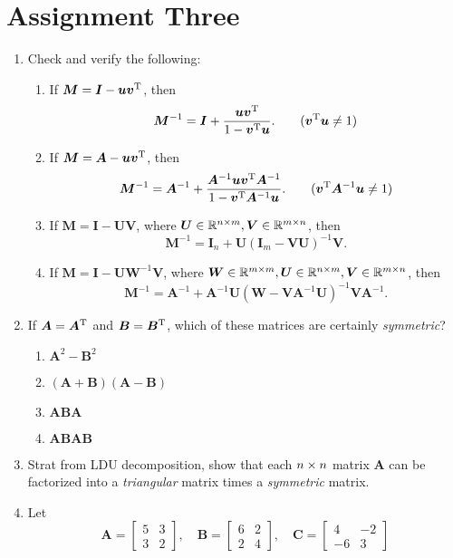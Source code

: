\section{Assignment Three}
\begin{enumerate}
\item
Check and verify the following:
\begin{enumerate}
\item
If $\bm M=\bm I-\bm u\bm v^{\mathrm T}$, then \[\bm M^{-1}=\bm I+\frac{\bm u\bm v^{\mathrm T}}{1-\bm v^{\mathrm T}\bm u}.\qquad(\bm v^{\mathrm T}\bm u\ne1)\]
\item
If $\bm M=\bm A-\bm u\bm v^{\mathrm T}$, then \[\bm M^{-1}=\bm A^{-1}+\frac{\bm A^{-1}\bm u\bm v^{\mathrm T}\bm A^{-1}}{1-\bm v^{\mathrm T}\bm A^{-1}\bm u}.\qquad(\bm v^{\mathrm T}\bm A^{-1}\bm u\ne1)\]
\item
If $\bm M=\bm I-\bm U\bm V$, where $\bm U\in\mathbb{R}^{n\times m},\bm V\in\mathbb{R}^{m\times n}$, then \[\bm M^{-1}=\bm I_n+\bm U(\bm I_m-\bm V\bm U)^{-1}\bm V.\]
\item
If $\bm M=\bm I-\bm U\bm W^{-1}\bm V$, where $\bm W\in\mathbb{R}^{m\times m},\bm U\in\mathbb{R}^{n\times m},\bm V\in\mathbb{R}^{m\times n}$, then \[\bm M^{-1}=\bm A^{-1}+\bm A^{-1}\bm U(\bm W-\bm V\bm A^{-1}\bm U)^{-1}\bm V\bm A^{-1}.\]
\end{enumerate}
\item
If $\bm A=\bm A^{\mathrm T}$ and $\bm B=\bm B^{\mathrm T}$, which of these matrices are certainly \textit{symmetric}?
\begin{enumerate}
\item
$\bm A^2-\bm B^2$
\item
$(\bm A+\bm B)(\bm A-\bm B)$
\item
$\bm{ABA}$
\item
$\bm{ABAB}$
\end{enumerate}
\item
Strat from LDU decomposition, show that each $n\times n$ matrix $\bm A$ can be factorized into a \textit{triangular} matrix times a \textit{symmetric} matrix.
\item
Let
\[
\bm A=\begin{bmatrix}
5&3\\3&2
\end{bmatrix},\quad\bm B=\begin{bmatrix}
6&2\\2&4
\end{bmatrix},\quad\bm C=\begin{bmatrix}
4&-2\\-6&3
\end{bmatrix}
\]
\end{enumerate}
